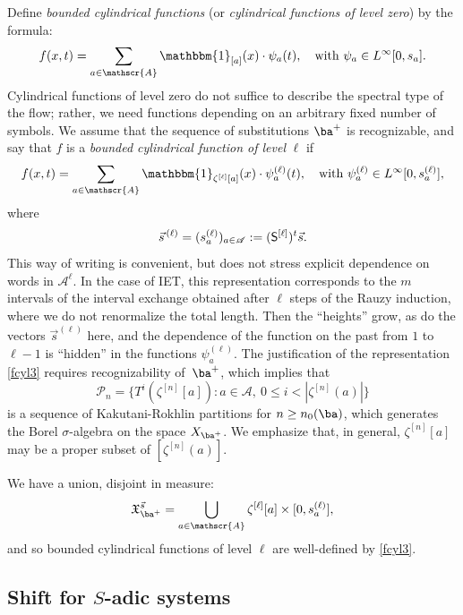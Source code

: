 \documentclass[10pt]{amsart}
\let\mathcal\mathscr
\newcommand{\One}{\mathbbm{1}}
\newcommand{\sep}{:}
\theoremstyle{plain}
\theoremstyle{definition}
\let\sig\sigma
\newcommand\Xx{\mathfrak{X}}
\newcommand\Ak{\mathcal{A}}
\newcommand\Pk{\mathcal{P}}
\newcommand\Sf{{\sf S}}
\newcommand\be{\begin{equation}}
\newcommand\ee{\end{equation}}
\begin{document}
Define \emph{bounded cylindrical functions} (or \emph{cylindrical functions of level zero}) by the formula:
\be \label{fcyl2}
f(x,t)=\sum_{a\in \Ak} \One_{[a]}(x) \cdot \psi_a(t),\quad \text{with } \psi_a\in L^\infty[0,s_a].
\ee
Cylindrical functions of level zero do not suffice to describe the spectral type of the flow; rather, we need functions depending on an arbitrary fixed number of symbols.
We assume that the sequence of substitutions $\ba^+$ is recognizable, and say that $f$ is a \emph{bounded cylindrical function of level} $\ell$ if
\be \label{fcyl3}
f(x,t)=\sum_{a\in \Ak} \One_{\zeta^{[\ell]}[a]}(x) \cdot \psi^{(\ell)}_a(t),\quad \text{with } \psi^{(\ell)}_a\in L^\infty [0,s^{(\ell)}_a],
\ee
where
\[
\vec{s}^{\,(\ell)}= (s^{(\ell)}_a)_{a\in \Ak}:= (\Sf^{[\ell]})^t \vec{s}.
\]
{This way of writing is convenient, but does not stress explicit dependence on words in $\Ak^\ell$. In the case of IET, this representation corresponds to the $m$ intervals of the interval exchange obtained after $\ell$ steps of the Rauzy induction, where we do not renormalize the total length. Then the ``heights'' grow, as do the vectors $\vec s^{(\ell)}$ here, and the dependence of the function on the past from $1$ to $\ell-1$ is ``hidden'' in the functions $\psi^{(\ell)}_a$.}
The justification of the representation \eqref{fcyl3} requires recognizability of~$\ba^+$, which implies that
\be \label{KR}
\Pk_n = \{T^i(\zeta^{[n]}[a])\sep a\in \Ak,\ 0 \le i < |\zeta^{[n]}(a)|\}
\ee
is a sequence of Kakutani-Rokhlin partitions for $n\ge n_0(\ba)$, which generates the Borel $\sig$-algebra on the space $X_{\ba^+}$. We emphasize that, in general, $\zeta^{[n]}[a]$ may be a proper subset of $[\zeta^{[n]}(a)]$.

We have a union, disjoint in measure:
\be \label{ell-decom}
\Xx_{\ba^+}^{\vec{s}} = \bigcup_{a\in \Ak} \zeta^{[\ell]}[a]\times [0, s_a^{(\ell)}],
\ee
and so bounded cylindrical functions of level $\ell$ are well-defined by \eqref{fcyl3}.

\subsection{Shift for $S$-adic systems}
\end{document}
